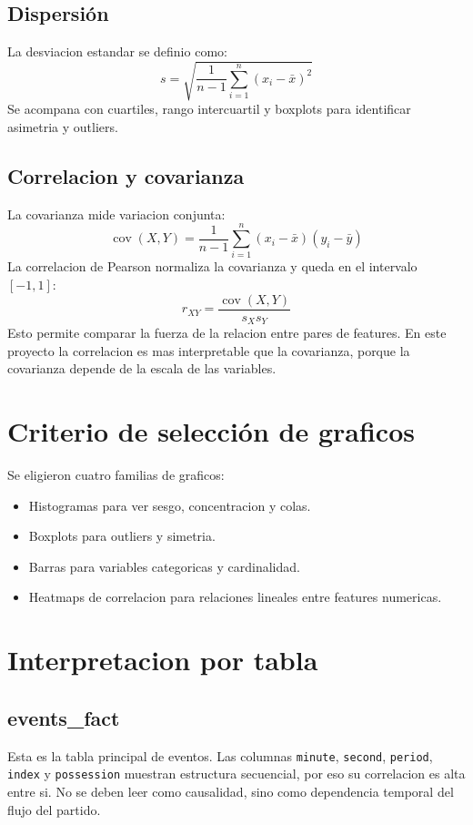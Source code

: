 \documentclass[11pt]{article}
\begin{document}
\subsection{Dispersión}
La desviacion estandar se definio como:
\[
s = \sqrt{\frac{1}{n-1}\sum_{i=1}^{n}(x_i-\bar{x})^2}
\]
Se acompana con cuartiles, rango intercuartil y boxplots para identificar asimetria y outliers.

\subsection{Correlacion y covarianza}
La covarianza mide variacion conjunta:
\[
\operatorname{cov}(X,Y)=\frac{1}{n-1}\sum_{i=1}^{n}(x_i-\bar{x})(y_i-\bar{y})
\]
La correlacion de Pearson normaliza la covarianza y queda en el intervalo $[-1,1]$:
\[
r_{XY}=\frac{\operatorname{cov}(X,Y)}{s_X s_Y}
\]
Esto permite comparar la fuerza de la relacion entre pares de features. En este proyecto la correlacion es mas interpretable que la covarianza, porque la covarianza depende de la escala de las variables.

\section{Criterio de selección de graficos}
Se eligieron cuatro familias de graficos:
\begin{itemize}
  \item Histogramas para ver sesgo, concentracion y colas.
  \item Boxplots para outliers y simetria.
  \item Barras para variables categoricas y cardinalidad.
  \item Heatmaps de correlacion para relaciones lineales entre features numericas.
\end{itemize}

\section{Interpretacion por tabla}

\subsection{events\_fact}
Esta es la tabla principal de eventos. Las columnas \texttt{minute}, \texttt{second}, \texttt{period}, \texttt{index} y \texttt{possession} muestran estructura secuencial, por eso su correlacion es alta entre si. No se deben leer como causalidad, sino como dependencia temporal del flujo del partido.
\end{document}
